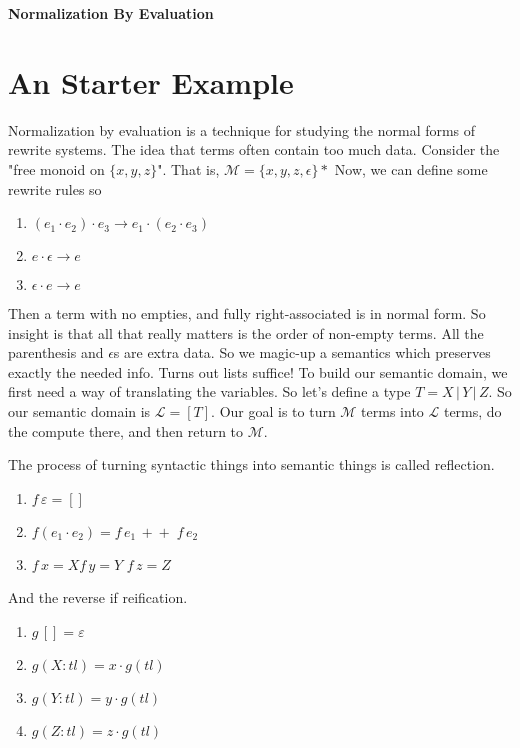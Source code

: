 \documentclass[12pt]{article}
\begin{document}
\baselineskip 12pt

\begin{center}
\textbf{\Large Normalization By Evaluation} \\
\end{center}

\section{An Starter Example}
Normalization by evaluation is a technique for studying the normal forms of rewrite systems.
The idea that terms often contain too much data. 
Consider the "free monoid on $\{x,y,z\}$".
That is, $\mathcal{M} = \{x,y,z,\epsilon\}*$
Now, we can define some rewrite rules so
\begin{enumerate}
\item $(e_1 \cdot e_2)\cdot e_3 \rightarrow e_1 \cdot (e_2 \cdot e_3)$
\item $e \cdot \epsilon \rightarrow e$
\item $\epsilon \cdot e \rightarrow e$
\end{enumerate}
Then a term with no empties, and fully right-associated is in normal form.
So insight is that all that really matters is the order of non-empty terms.
All the parenthesis and $\epsilon$s are extra data.
So we magic-up a semantics which preserves exactly the needed info.
Turns out lists suffice!
To build our semantic domain, we first need a way of translating the variables.
So let's define a type $T = X \,|\, Y \,|\, Z$.
So our semantic domain is $\mathcal{L} = [T]$.
Our goal is to turn $\mathcal{M}$ terms into $\mathcal{L}$ terms, do the compute there, and then return to $\mathcal{M}$.

The process of turning syntactic things into semantic things is called reflection.
\begin{enumerate}
\item $f\, \varepsilon = []$
\item $f (e_1\cdot e_2) = f\, e_1\,+\!+\; f\,e_2$
\item $f\, x = X$\quad $f\, y = Y$ \quad $f\, z = Z$
\end{enumerate}
And the reverse if reification.

\begin{enumerate}
\item $g\, [] = \varepsilon$
\item $g (X : tl) = x \cdot g(tl)$
\item $g (Y : tl) = y \cdot g(tl)$
\item $g (Z : tl) = z \cdot g(tl)$
\end{enumerate}
\end{document}
